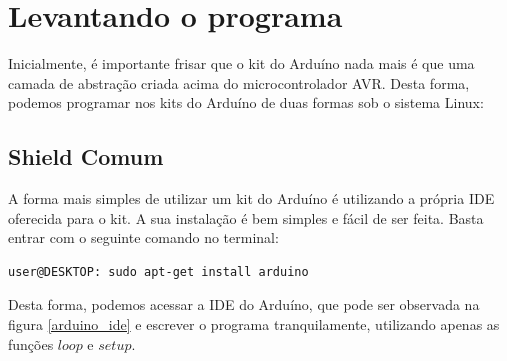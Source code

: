 \section{Levantando o programa}\label{program}

Inicialmente, é importante frisar que o kit do Arduíno nada mais é que uma camada de abstração criada acima do microcontrolador AVR. Desta forma, podemos programar nos kits do Arduíno de duas formas sob o sistema Linux:

\subsection{Shield Comum}\label{noob}

A forma mais simples de utilizar um kit do Arduíno é utilizando a própria IDE oferecida para o kit. A sua instalação é bem simples e fácil de ser feita. Basta entrar com o seguinte comando no terminal:


\begin{lstlisting}[style=Bash,numbers=none]
user@DESKTOP: sudo apt-get install arduino
\end{lstlisting}

Desta forma, podemos acessar a IDE do Arduíno, que pode ser observada na figura \ref{arduino_ide} e escrever o programa tranquilamente, utilizando apenas as funções $loop$ e $setup$.


